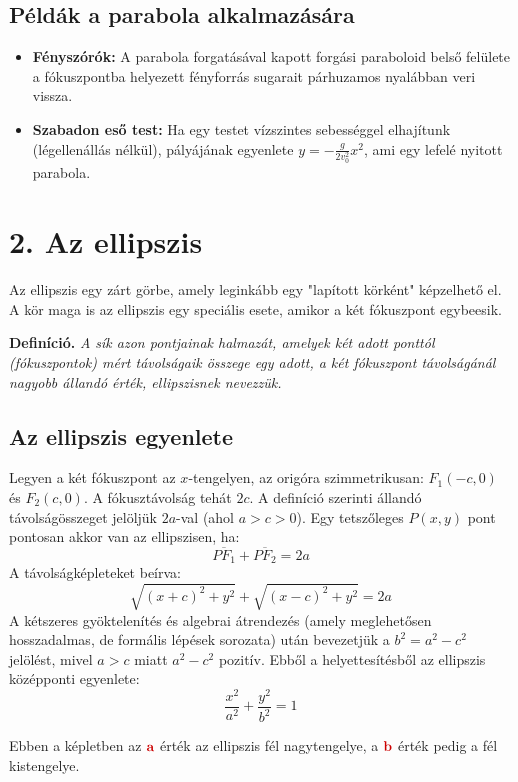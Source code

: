 \documentclass[12pt, a4paper]{article}
\newcommand{\textbfr}[1]{\textbf{\textcolor{bvred}{#1}}}
\begin{document}
\subsection*{Példák a parabola alkalmazására}
\begin{itemize}
    \item \textbf{Fényszórók:} A parabola forgatásával kapott forgási paraboloid belső felülete a fókuszpontba helyezett fényforrás sugarait párhuzamos nyalábban veri vissza.
    \item \textbf{Szabadon eső test:} Ha egy testet vízszintes sebességgel elhajítunk (légellenállás nélkül), pályájának egyenlete $y = -\frac{g}{2v_0^2}x^2$, ami egy lefelé nyitott parabola.
\end{itemize}

\section*{2. Az ellipszis}

Az ellipszis egy zárt görbe, amely leginkább egy "lapított körként" képzelhető el. A kör maga is az ellipszis egy speciális esete, amikor a két fókuszpont egybeesik.

\textbf{Definíció.} \textit{A sík azon pontjainak halmazát, amelyek két adott ponttól (fókuszpontok) mért távolságaik összege egy adott, a két fókuszpont távolságánál nagyobb állandó érték, \textcolor{bvred}{ellipszisnek} nevezzük.}

\subsection*{Az ellipszis egyenlete}

Legyen a két fókuszpont az $x$-tengelyen, az origóra szimmetrikusan: $F_1(-c, 0)$ és $F_2(c, 0)$. A fókusztávolság tehát $2c$. A definíció szerinti állandó távolságösszeget jelöljük $2a$-val (ahol $a > c > 0$).
Egy tetszőleges $P(x,y)$ pont pontosan akkor van az ellipszisen, ha:
\[ \overline{PF_1} + \overline{PF_2} = 2a \]
A távolságképleteket beírva:
\[ \sqrt{(x+c)^2 + y^2} + \sqrt{(x-c)^2 + y^2} = 2a \]
A kétszeres gyöktelenítés és algebrai átrendezés (amely meglehetősen hosszadalmas, de formális lépések sorozata) után bevezetjük a $b^2 = a^2 - c^2$ jelölést, mivel $a > c$ miatt $a^2 - c^2$ pozitív. Ebből a helyettesítésből az ellipszis középponti egyenlete:
\[ \frac{x^2}{a^2} + \frac{y^2}{b^2} = 1 \]

Ebben a képletben az $\textbfr{a}$ érték az ellipszis fél nagytengelye, a $\textbfr{b}$ érték pedig a fél kistengelye.
\end{document}
